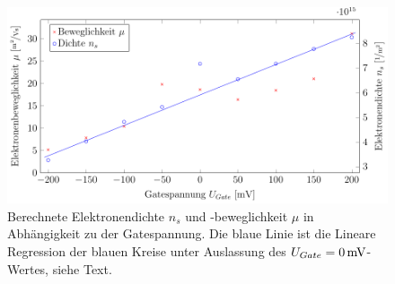 \begin{figure}[h]
	\centering
	\includegraphics[scale=1]{graphs/gate/auswertung_neu.pdf}
	\caption[Auswertung der Gatespannungsvariation]{
		Berechnete Elektronendichte $n_s$ und -beweglichkeit $\mu$ in Abhängigkeit zu der Gatespannung. Die blaue Linie ist die Lineare Regression der blauen Kreise unter Auslassung des $U_{Gate}=\unit[0]{mV}$-Wertes, siehe Text.
	}
	\label{fig:gate_ausw}
\end{figure}

